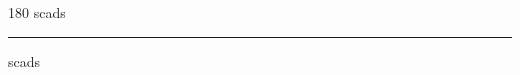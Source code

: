 
\begin{frame}
\begin{center}
\begin{turn}{180}
{\fontsize{2.5cm}{1em}\selectfont scads}
\end{turn}
\vspace{1em}\par  
\hrule
\vspace{1em}\par  
{\fontsize{2.5cm}{1em}\selectfont scads}
\end{center}
\end{frame}
